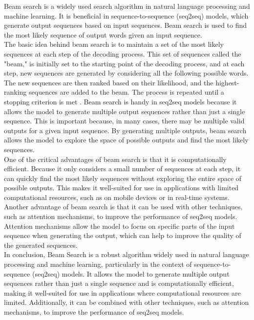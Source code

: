 Beam search is a widely used search algorithm in natural language processing and machine learning. It is beneficial in sequence-to-sequence (seq2seq) models, which generate output sequences based on input sequences. Beam search is used to find the most likely sequence of output words given an input sequence.
\\
The basic idea behind beam search is to maintain a set of the most likely sequences at each step of the decoding process. This set of sequences called the "beam," is initially set to the starting point of the decoding process, and at each step, new sequences are generated by considering all the following possible words. The new sequences are then ranked based on their likelihood, and the highest-ranking sequences are added to the beam. The process is repeated until a stopping criterion is met \cite{10.1371/journal.pone.0211558}.
Beam search is handy in seq2seq models because it allows the model to generate multiple output sequences rather than just a single sequence. This is important because, in many cases, there may be multiple valid outputs for a given input sequence. By generating multiple outputs, beam search allows the model to explore the space of possible outputs and find the most likely sequences.
\\
One of the critical advantages of beam search is that it is computationally efficient. Because it only considers a small number of sequences at each step, it can quickly find the most likely sequences without exploring the entire space of possible outputs. This makes it well-suited for use in applications with limited computational resources, such as on mobile devices or in real-time systems.
Another advantage of beam search is that it can be used with other techniques, such as attention mechanisms, to improve the performance of seq2seq models. Attention mechanisms allow the model to focus on specific parts of the input sequence when generating the output, which can help to improve the quality of the generated sequences.
\\
In conclusion, Beam Search is a robust algorithm widely used in natural language processing and machine learning, particularly in the context of sequence-to-sequence (seq2seq) models. It allows the model to generate multiple output sequences rather than just a single sequence and is computationally efficient, making it well-suited for use in applications where computational resources are limited. Additionally, it can be combined with other techniques, such as attention mechanisms, to improve the performance of seq2seq models.